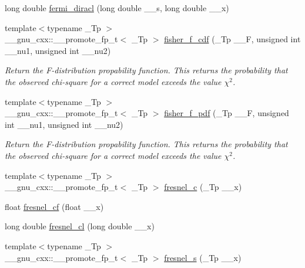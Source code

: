 \begin{DoxyCompactItemize}
long double \hyperlink{group__gnu__math__spec__func_ga3876af54a92853036cc88ec6b8ea5d67}{fermi\+\_\+diracl} (long double \+\_\+\+\_\+s, long double \+\_\+\+\_\+x)
\item 
{\footnotesize template$<$typename \+\_\+\+Tp $>$ }\\\+\_\+\+\_\+gnu\+\_\+cxx\+::\+\_\+\+\_\+promote\+\_\+fp\+\_\+t$<$ \+\_\+\+Tp $>$ \hyperlink{group__gnu__math__spec__func_ga48e9043ad2a45c40aeeb782e7f536bdd}{fisher\+\_\+f\+\_\+cdf} (\+\_\+\+Tp \+\_\+\+\_\+F, unsigned int \+\_\+\+\_\+nu1, unsigned int \+\_\+\+\_\+nu2)
\begin{DoxyCompactList}\small\item\em Return the F-\/distribution propability function. This returns the probability that the observed chi-\/square for a correct model exceeds the value $ \chi^2 $. \end{DoxyCompactList}\item 
{\footnotesize template$<$typename \+\_\+\+Tp $>$ }\\\+\_\+\+\_\+gnu\+\_\+cxx\+::\+\_\+\+\_\+promote\+\_\+fp\+\_\+t$<$ \+\_\+\+Tp $>$ \hyperlink{group__gnu__math__spec__func_gab0ecd24dba55d2117cf4d623a5f9637a}{fisher\+\_\+f\+\_\+pdf} (\+\_\+\+Tp \+\_\+\+\_\+F, unsigned int \+\_\+\+\_\+nu1, unsigned int \+\_\+\+\_\+nu2)
\begin{DoxyCompactList}\small\item\em Return the F-\/distribution propability function. This returns the probability that the observed chi-\/square for a correct model exceeds the value $ \chi^2 $. \end{DoxyCompactList}\item 
{\footnotesize template$<$typename \+\_\+\+Tp $>$ }\\\+\_\+\+\_\+gnu\+\_\+cxx\+::\+\_\+\+\_\+promote\+\_\+fp\+\_\+t$<$ \+\_\+\+Tp $>$ \hyperlink{group__gnu__math__spec__func_gab6a34ce43bad4e8181ad9c40aebb9ada}{fresnel\+\_\+c} (\+\_\+\+Tp \+\_\+\+\_\+x)
\item 
float \hyperlink{group__gnu__math__spec__func_ga02ca7579d5aef96cba69e38e988e7a42}{fresnel\+\_\+cf} (float \+\_\+\+\_\+x)
\item 
long double \hyperlink{group__gnu__math__spec__func_gaa3f82a7569d61c2f7c194d2e64b616f8}{fresnel\+\_\+cl} (long double \+\_\+\+\_\+x)
\item 
{\footnotesize template$<$typename \+\_\+\+Tp $>$ }\\\+\_\+\+\_\+gnu\+\_\+cxx\+::\+\_\+\+\_\+promote\+\_\+fp\+\_\+t$<$ \+\_\+\+Tp $>$ \hyperlink{group__gnu__math__spec__func_gaaf6e2b182d0abde6fde72c0b8b9f959c}{fresnel\+\_\+s} (\+\_\+\+Tp \+\_\+\+\_\+x)

\end{DoxyCompactItemize}
